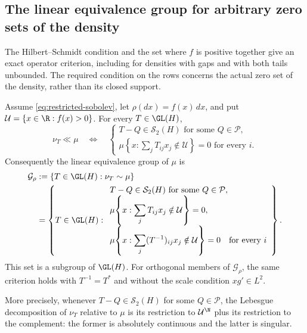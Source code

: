 \subsection{The linear equivalence group for arbitrary zero sets of the density}
\label{sec:linear-equivalence-group}

The Hilbert--Schmidt condition and the set where \(f\) is positive together
give an exact operator criterion, including for densities with gaps and
with both tails unbounded.  The required condition on the rows concerns the
actual zero set of the density, rather than its closed support.

\begin{theorem}
\label{thm:linear-equivalence-group}
Assume \eqref{eq:restricted-sobolev}, let $\rho(dx)=f(x)\,dx$, and put
$\mathcal U=\{x\in\R:f(x)>0\}$.  For every $T\in\GL(H)$,
\begin{equation}
 \nu_T\ll\mu
 \quad\Longleftrightarrow\quad
 \begin{cases}
 T-Q\in\mathcal S_2(H)\text{ for some }Q\in\mathcal P,\\
 \displaystyle
 \mu\!\left\{x:\sum_jT_{ij}x_j\notin\mathcal U\right\}=0
       \text{ for every }i.
 \end{cases}
 \label{eq:absolute-continuity-operator-criterion}
\end{equation}
Consequently the linear equivalence group of $\mu$ is
\begin{equation}
 \begin{aligned}
 \mathcal G_\rho
 &:=\{T\in\GL(H):\nu_T\sim\mu\}\\
 &=\left\{T\in\GL(H):
 \begin{array}{l}
 T-Q\in\mathcal S_2(H)\text{ for some }Q\in\mathcal P,\\
 \displaystyle\mu\!\left\{x:\sum_jT_{ij}x_j\notin\mathcal U\right\}=0,\\
 \displaystyle\mu\!\left\{x:\sum_j(T^{-1})_{ij}x_j\notin\mathcal U\right\}=0
       \quad\text{for every }i
 \end{array}\right\}.
 \end{aligned}
 \label{eq:linear-equivalence-group}
\end{equation}
This set is a subgroup of $\GL(H)$.  For orthogonal members of
$\mathcal G_\rho$, the same criterion holds with $T^{-1}=T^*$
and without the scale condition $xg'\in L^2$.

More precisely, whenever $T-Q\in\mathcal S_2(H)$ for some
$Q\in\mathcal P$, the Lebesgue decomposition of $\nu_T$ relative to
$\mu$ is its restriction to $\mathcal U^{\N}$ plus its restriction
to the complement: the former is absolutely continuous and the latter
is singular.
\end{theorem}
